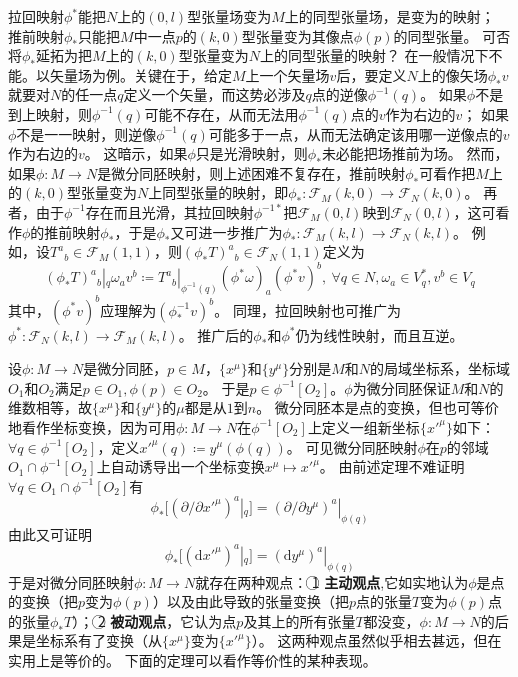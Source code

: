 \begin{note}
	拉回映射$\phi^*$能把$N$上的$(0, l)$型张量场变为$M$上的同型张量场，是变为的映射；
	推前映射$\phi_*$只能把$M$中一点$p$的$(k, 0)$型张量变为其像点$\phi(p)$的同型张量。
	可否将$\phi_*$延拓为把$M$上的$(k, 0)$型张量变为$N$上的同型张量的映射？
	在一般情况下不能。以矢量场为例。关键在于，给定$M$上一个矢量场$v$后，要定义$N$上的像矢场$\phi_*v$就要对$N$的任一点$q$定义一个矢量，而这势必涉及$q$点的逆像$\phi^{-1}(q)$。
	如果$\phi$不是到上映射，则$\phi^{-1}(q)$可能不存在，从而无法用$\phi^{-1}(q)$点的$v$作为右边的$v$；
	如果$\phi$不是一一映射，则逆像$\phi^{-1}(q)$可能多于一点，从而无法确定该用哪一逆像点的$v$作为右边的$v$。
	这暗示，如果$\phi$只是光滑映射，则$\phi_*$未必能把场推前为场。
	然而，如果$\phi \colon M \to N$是微分同胚映射，则上述困难不复存在，推前映射$\phi_*$可看作把$M$上的$(k, 0)$型张量变为$N$上同型张量的映射，即$\phi_* \colon \mathscr{F}_M(k, 0) \to \mathscr{F}_N(k, 0)$。
	再者，由于$\phi^{-1}$存在而且光滑，其拉回映射$\phi^{-1*}$把$\mathscr{F}_M(0, l)$映到$\mathscr{F}_N(0, l)$，这可看作$\phi$的推前映射$\phi_*$，于是$\phi_*$又可进一步推广为$\phi_* \colon \mathscr{F}_M(k, l) \to \mathscr{F}_N(k, l)$。
	例如，设$T^a{}_b \in \mathscr{F}_M(1, 1)$，则$(\phi_*T)^a{}_b \in \mathscr{F}_N(1, 1)$定义为
	$$(\phi_*T)^a{}_b|_q\omega_av^b \coloneq T^a{}_b|_{\phi^{-1}(q)}(\phi^*\omega)_a(\phi^*v)^b, ~ \forall q \in N, \omega_a \in V^*_q, v^b \in V_q$$
	其中，$(\phi^*v)^b$应理解为$(\phi^{-1}_*v)^b$。
	同理，拉回映射也可推广为$\phi^* \colon \mathscr{F}_N(k, l) \to \mathscr{F}_M(k, l)$。
	推广后的$\phi_*$和$\phi^*$仍为线性映射，而且互逆。
\end{note}

设$\phi \colon M \to N$是微分同胚，$p \in M$，$\{x^\mu\}$和$\{y^\mu\}$分别是$M$和$N$的局域坐标系，坐标域$O_1$和$O_2$满足$p \in O_1, \phi(p) \in O_2$。
于是$p \in \phi^{-1}[O_2]$。$\phi$为微分同胚保证$M$和$N$的维数相等，故$\{x^\mu\}$和$\{y^\mu\}$的$\mu$都是从$1$到$n$。
微分同胚本是点的变换，但也可等价地看作坐标变换，因为可用$\phi \colon M \to N$在$\phi^{-1}[O_2]$上定义一组新坐标$\{x'^\mu\}$如下：
$\forall q \in \phi^{-1}[O_2]$，定义$x'^\mu(q) \coloneq y^\mu(\phi(q))$。
可见微分同胚映射$\phi$在$p$的邻域$O_1 \cap \phi^{-1}[O_2]$上自动诱导出一个坐标变换$x^\mu \mapsto x'^\mu$。
由前述定理不难证明$\forall q \in O_1 \cap \phi^{-1}[O_2]$有
$$\phi_*[(\partial / \partial x'^\mu)^a|_q] = (\partial / \partial y^\mu)^a|_{\phi(q)}$$
由此又可证明
$$\phi_*[(\mathrm{d}x'^\mu)^a|_q] = (\mathrm{d}y^\mu)^a|_{\phi(q)}$$
于是对微分同胚映射$\phi \colon M \to N$就存在两种观点：
\textcircled{1} \textbf{主动观点},它如实地认为$\phi$是点的变换（把$p$变为$\phi(p)$）以及由此导致的张量变换（把$p$点的张量$T$变为$\phi(p)$点的张量$\phi_*T$）；
\textcircled{2} \textbf{被动观点}，它认为点$p$及其上的所有张量$T$都没变，$\phi \colon M \to N$的后果是坐标系有了变换（从$\{x^\mu\}$变为$\{x'^\mu\}$）。
这两种观点虽然似乎相去甚远，但在实用上是等价的。
下面的定理可以看作等价性的某种表现。

